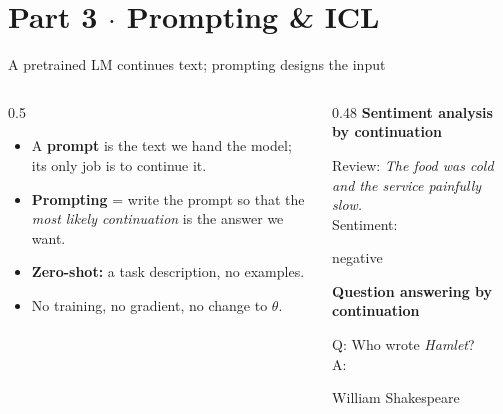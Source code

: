 \section{Part 3 $\cdot$ Prompting \& ICL}

\begin{frame}{A pretrained LM continues text; prompting designs the input}
\begin{columns}[T]
\begin{column}{0.5\textwidth}
\begin{itemize}\setlength{\itemsep}{6pt}
  \item A \textbf{prompt} is the text we hand the model; its only job is to continue it.
  \item \textbf{Prompting} = write the prompt so that the \emph{most likely continuation} is the answer we want.
  \item \textbf{Zero-shot:} a task description, no examples.
  \item No training, no gradient, no change to $\theta$.
\end{itemize}
\end{column}
\begin{column}{0.48\textwidth}
\textbf{Sentiment analysis by continuation}
\begin{userbox}Review: \emph{The food was cold and the service painfully slow.}\\ Sentiment:\end{userbox}
\begin{modelbox}negative\end{modelbox}
\textbf{Question answering by continuation}
\begin{userbox}Q: Who wrote \emph{Hamlet}?\\ A:\end{userbox}
\begin{modelbox}William Shakespeare\end{modelbox}
\end{column}
\end{columns}
\end{frame}

